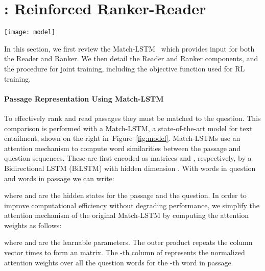 \documentclass[letterpaper]{article} \usepackage{aaai18}  \usepackage{times}  \usepackage{helvet}  \usepackage{courier}  \usepackage{url}  \usepackage{graphicx}  \usepackage{comment}
\begin{document}
\section{: Reinforced Ranker-Reader}
\label{sec:method}


\begin{figure*}[t]
\centering
\texttt{[image: model]}

\caption{Overview of training our model, comprising a Ranker and a Reader based on Match-LSTM as shown on the right side. The Ranker selects a passage  and the Reader predicts the start and end positions of the answer in . The reward for the Ranker depends on similarity of the extracted answer with the ground-truth answer . To accelerate Reader convergence,
we also sample several negative passages without ground-truth answer.}
\label{fig:model}
\end{figure*}

In this section, we first review the Match-LSTM~\cite{wang2015learning:NAACL2016} which provides input for both the Reader and Ranker. We then detail the Reader and Ranker components, and the procedure for joint training, including the objective function used for RL training.


\paragraph{Passage Representation Using Match-LSTM}
To effectively rank and read passages they must be matched to the question.  This comparison is performed with a Match-LSTM, a state-of-the-art model for text entailment, shown on the right in~Figure~\ref{fig:model}. Match-LSTMs use an attention mechanism to compute word similarities between the passage and question sequences.  These are first encoded as matrices  and , respectively, by a Bidirectional LSTM (BiLSTM) with hidden dimension .  With  words in question  and  words in passage  we can write:



where  and  are the hidden states for the passage and the question. 
In order to improve computational efficiency without degrading performance, we simplify the attention mechanism of the original Match-LSTM by computing the attention weights  as follows:




where  and  are the learnable parameters. The outer product  repeats the column vector   times to form an  matrix. The -th column of  represents the normalized attention weights over all the question words for the -th word in passage.
\end{document}

